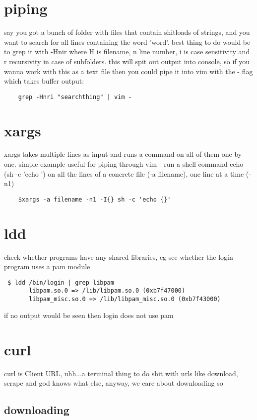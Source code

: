 \section{piping}
\label{sec:piping}

say you got a bunch of  folder with files that contain shitloads of strings, and you want to search for all lines containing the word 'word'. best thing to do would be to grep it with -Hnir where H is filename, n line number, i is case sensitivity and r recursivity in case of subfolders. this will spit out output into console, so if you wanna work with this as a text file then you could pipe it into vim with the - flag which takes buffer output:
\begin{verbatim}
	grep -Hnri "searchthing" | vim -
\end{verbatim}

\section{xargs}%
\label{sec:xargs}

xargs takes multiple lines as input and runs a command on all of them one by one. simple example useful for piping through vim - run a shell command echo (sh -c 'echo {}') on all the lines of a concrete file (-a filename), one line at a time (-n1)
\begin{verbatim}
	$xargs -a filename -n1 -I{} sh -c 'echo {}'
\end{verbatim}
\section{ldd}%
\label{sec:ldd}

check whether programs have any shared libraries, eg see whether the login program uses a pam module
\begin{verbatim}
 $ ldd /bin/login | grep libpam
       libpam.so.0 => /lib/libpam.so.0 (0xb7f47000)
       libpam_misc.so.0 => /lib/libpam_misc.so.0 (0xb7f43000)
\end{verbatim}
if no output would be seen then login does not use pam
\section{curl}%
\label{sec:curl}

curl is Client URL, uhh...a terminal thing to do shit with urls like download, scrape and god knows what else, anyway, we care about downloading so
\subsection{downloading}%
\label{sub:downloading}


